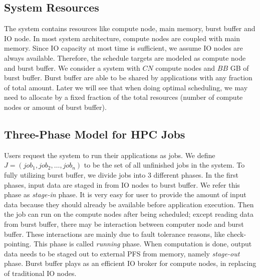 \subsection{System Resources}
The system contains resources like compute node, main memory, burst buffer and IO node.
In most system architecture, compute nodes are coupled with main memory.
Since IO capacity at most time is sufficient, we assume IO nodes are always available.
Therefore, the schedule targets are modeled as compute node and burst buffer.
We consider a system with $CN$ compute nodes and $BB$ GB of burst buffer.
Burst buffer are able to be shared by applications with any fraction of total amount.
Later we will see that when doing optimal scheduling, we may need to allocate by a fixed
fraction of the total resources (number of compute nodes or amount of burst buffer).

\subsection{Three-Phase Model for HPC Jobs}
Users request the system to run their applications as jobs.
We define $J = (job_1, job_2, \ldots, job_n)$ to be the set of all unfinished jobs in the system.
To fully utilizing burst buffer, we divide jobs into 3 different phases.
In the first phases, input data are staged in from IO nodes to burst buffer.
We refer this phase as \textit{stage-in} phase.
It is very easy for user to provide the amount of input data
because they should already be available before application execution. 
Then the job can run on the compute nodes after being scheduled;
except reading data from burst buffer, there may be interaction between 
computer node and burst buffer.
These interactions are mainly due to fault tolerance reasons, like check-pointing.
This phase is called \textit{running} phase.
When computation is done, output data needs to be staged out to external PFS from memory,
namely \textit{stage-out} phase.
Burst buffer plays as an efficient IO broker for compute nodes,
in replacing of traditional IO nodes.

